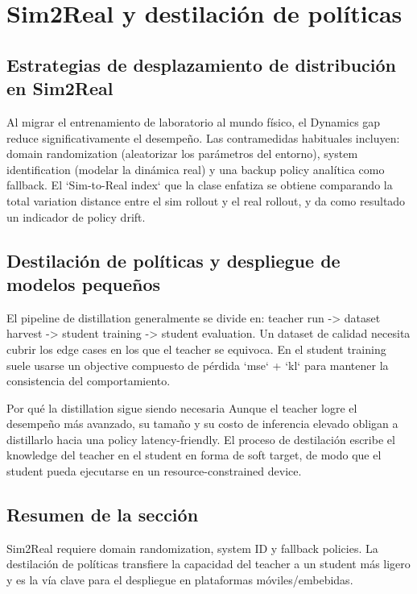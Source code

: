 \section{Sim2Real y destilación de políticas}

\subsection{Estrategias de desplazamiento de distribución en Sim2Real}

Al migrar el entrenamiento de laboratorio al mundo físico, el Dynamics gap reduce significativamente el desempeño. Las contramedidas habituales incluyen: domain randomization (aleatorizar los parámetros del entorno), system identification (modelar la dinámica real) y una backup policy analítica como fallback. El `Sim-to-Real index` que la clase enfatiza se obtiene comparando la total variation distance entre el sim rollout y el real rollout, y da como resultado un indicador de policy drift.

\subsection{Destilación de políticas y despliegue de modelos pequeños}

El pipeline de distillation generalmente se divide en: teacher run -> dataset harvest -> student training -> student evaluation. Un dataset de calidad necesita cubrir los edge cases en los que el teacher se equivoca. En el student training suele usarse un objective compuesto de pérdida `mse` + `kl` para mantener la consistencia del comportamiento.

\begin{knowledgebox}{Por qué la distillation sigue siendo necesaria}
Aunque el teacher logre el desempeño más avanzado, su tamaño y su costo de inferencia elevado obligan a distillarlo hacia una policy latency-friendly. El proceso de destilación escribe el knowledge del teacher en el student en forma de soft target, de modo que el student pueda ejecutarse en un resource-constrained device.
\end{knowledgebox}

\subsection{Resumen de la sección}

Sim2Real requiere domain randomization, system ID y fallback policies. La destilación de políticas transfiere la capacidad del teacher a un student más ligero y es la vía clave para el despliegue en plataformas móviles/embebidas.

